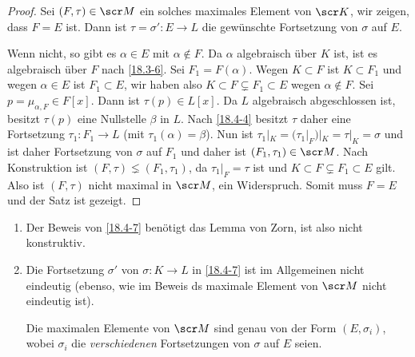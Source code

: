 \begin{st}[Fortsetzungsatz]
\begin{proof}
		Sei $(F, \tau) \in \scr M$ ein solches maximales Element von $\scr K$, wir zeigen, dass $F = E$ ist.
		Dann ist $\tau = \sigma': E \to L$ die gewünschte Fortsetzung von $\sigma$ auf $E$.

		Wenn nicht, so gibt es $\alpha \in E$ mit $\alpha \not\in F$.
		Da $\alpha$ algebraisch über $K$ ist, ist es algebraisch über $F$ nach \ref{18.3-6}.
		Sei $F_1 = F(\alpha)$.
		Wegen $K \subset F$ ist $K \subset F_1$ und wegen $\alpha \in E$ ist $F_1 \subset E$, wir haben also $K \subset F \subsetneq F_1 \subset E$ wegen $\alpha \not\in F$.
		Sei $p = \mu_{\alpha, F} \in F[x]$.
		Dann ist $\tau(p) \in L[x]$.
		Da $L$ algebraisch abgeschlossen ist, besitzt $\tau(p)$ eine Nullstelle $\beta$ in $L$.
		Nach \ref{18.4-4} besitzt $\tau$ daher eine Fortsetzung $\tau_1: F_1 \to L$ (mit $\tau_1(\alpha) = \beta$).
		Nun ist $\tau_1|_K = (\tau_1|_F)|_K = \tau|_K = \sigma$ und ist daher Fortsetzung von $\sigma$ auf $F_1$ und daher ist $(F_1, \tau_1) \in \scr M$.
		Nach Konstruktion ist $(F, \tau) \lneq (F_1, \tau_1)$, da $\tau_1|_F = \tau$ ist und $K \subset F \subsetneq F_1 \subset E$ gilt.
		Also ist $(F, \tau)$ nicht maximal in $\scr M$, ein Widerspruch.
		Somit muss $F = E$ und der Satz ist gezeigt.

	\end{proof}
\end{st}

\begin{nt} \label{18.4-8}
	\begin{enumerate}[1.)]
		\item
			Der Beweis von \ref{18.4-7} benötigt das Lemma von Zorn, ist also nicht konstruktiv.
		\item
			Die Fortsetzung $\sigma'$ von $\sigma: K \to L$ in \ref{18.4-7} ist im Allgemeinen nicht eindeutig (ebenso, wie im Beweis ds maximale Element von $\scr M$ nicht eindeutig ist).

			Die maximalen Elemente von $\scr M$ sind genau von der Form $(E, \sigma_i)$, wobei $\sigma_i$ die \emph{verschiedenen} Fortsetzungen von $\sigma$ auf $E$ seien.
	\end{enumerate}
\end{nt}

